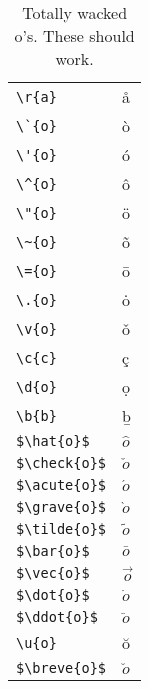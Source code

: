 \documentclass{article}
\begin{document}
\begin{table}
\begin{center}
\begin{tabular}{ll}
\verb#\r{a}#& \r{a}\\
\verb#\`{o}#& \`{o}\\
\verb#\'{o}#& \'{o}\\
\verb#\^{o}#& \^{o}\\
\verb#\"{o}#& \"{o}\\
\verb#\~{o}#& \~{o}\\
\verb#\={o}#& \={o}\\
\verb#\.{o}#& \.{o}\\
\verb#\v{o}#& \v{o}\\
\verb#\c{c}#& \c{c}\\
\verb#\d{o}#& \d{o}\\
\verb#\b{b}#& \b{b}\\
\verb#$\hat{o}$#& $\hat{o}$\\
\verb#$\check{o}$#& $\check{o}$\\
\verb#$\acute{o}$#& $\acute{o}$\\
\verb#$\grave{o}$#& $\grave{o}$\\
\verb#$\tilde{o}$#& $\tilde{o}$\\
\verb#$\bar{o}$#& $\bar{o}$\\
\verb#$\vec{o}$#& $\vec{o}$\\
\verb#$\dot{o}$#& $\dot{o}$\\
\verb#$\ddot{o}$#& $\ddot{o}$\\
\verb#\u{o}#& \u{o}\\
\verb#$\breve{o}$#& $\breve{o}$
\end{tabular}
\caption{Totally wacked o's.  These should work.}
\end{center}
\end{table}
\pagebreak
\end{document}
